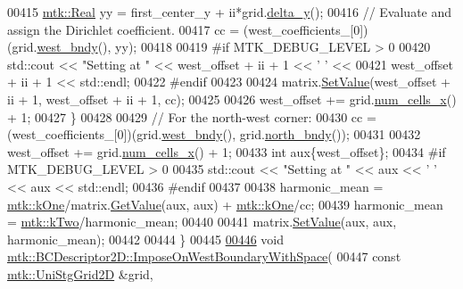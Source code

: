 \begin{DoxyCode}
00415     \hyperlink{group__c01-roots_gac080bbbf5cbb5502c9f00405f894857d}{mtk::Real} yy = first\_center\_y + ii*grid.\hyperlink{classmtk_1_1UniStgGrid2D_a65a78cfc80ffdbeb282ed57af4dc5cb4}{delta\_y}();
00416     \textcolor{comment}{// Evaluate and assign the Dirichlet coefficient.}
00417     cc = (west\_coefficients\_[0])(grid.\hyperlink{classmtk_1_1UniStgGrid2D_af2b1712387ded85edaf2b64617d3fc13}{west\_bndy}(), yy);
00418 
00419 \textcolor{preprocessor}{    #if MTK\_DEBUG\_LEVEL > 0}
00420     std::cout << \textcolor{stringliteral}{"Setting at "} << west\_offset + ii + 1 << \textcolor{charliteral}{' '} <<
00421       west\_offset + ii + 1 << std::endl;
00422 \textcolor{preprocessor}{    #endif}
00423 
00424     matrix.\hyperlink{classmtk_1_1DenseMatrix_a784ce5784109ac86bfb9d8562b334b13}{SetValue}(west\_offset + ii + 1, west\_offset + ii + 1, cc);
00425 
00426     west\_offset += grid.\hyperlink{classmtk_1_1UniStgGrid2D_a2d182866a398aba8e4829590e85bf939}{num\_cells\_x}() + 1;
00427   \}
00428 
00429   \textcolor{comment}{// For the north-west corner:}
00430   cc = (west\_coefficients\_[0])(grid.\hyperlink{classmtk_1_1UniStgGrid2D_af2b1712387ded85edaf2b64617d3fc13}{west\_bndy}(), grid.\hyperlink{classmtk_1_1UniStgGrid2D_afe1ead253cdeb5503e0489eba8fd84e2}{north\_bndy}());
00431 
00432   west\_offset += grid.\hyperlink{classmtk_1_1UniStgGrid2D_a2d182866a398aba8e4829590e85bf939}{num\_cells\_x}() + 1;
00433   \textcolor{keywordtype}{int} aux\{west\_offset\};
00434 \textcolor{preprocessor}{  #if MTK\_DEBUG\_LEVEL > 0}
00435   std::cout << \textcolor{stringliteral}{"Setting at "} << aux << \textcolor{charliteral}{' '} << aux << std::endl;
00436 \textcolor{preprocessor}{  #endif}
00437 
00438   harmonic\_mean = \hyperlink{group__c01-roots_ga26407c24d43b6b95480943340d285c71}{mtk::kOne}/matrix.\hyperlink{classmtk_1_1DenseMatrix_a4b23ecbebd970b5eea915dbb50691024}{GetValue}(aux, aux) + 
      \hyperlink{group__c01-roots_ga26407c24d43b6b95480943340d285c71}{mtk::kOne}/cc;
00439   harmonic\_mean = \hyperlink{group__c01-roots_gaf39c2d851a2db744f4feb1c5ab3ec2cf}{mtk::kTwo}/harmonic\_mean;
00440 
00441   matrix.\hyperlink{classmtk_1_1DenseMatrix_a784ce5784109ac86bfb9d8562b334b13}{SetValue}(aux, aux, harmonic\_mean);
00442 
00444 \}
00445 
\hypertarget{mtk__bc__descriptor__2d_8cc_source_l00446}{}\hyperlink{classmtk_1_1BCDescriptor2D_aa5d88027ff9c5d2eccab93cd51154c9e}{00446} \textcolor{keywordtype}{void} \hyperlink{classmtk_1_1BCDescriptor2D_aa5d88027ff9c5d2eccab93cd51154c9e}{mtk::BCDescriptor2D::ImposeOnWestBoundaryWithSpace}(
00447     \textcolor{keyword}{const} \hyperlink{classmtk_1_1UniStgGrid2D}{mtk::UniStgGrid2D} &grid,

\end{DoxyCode}
